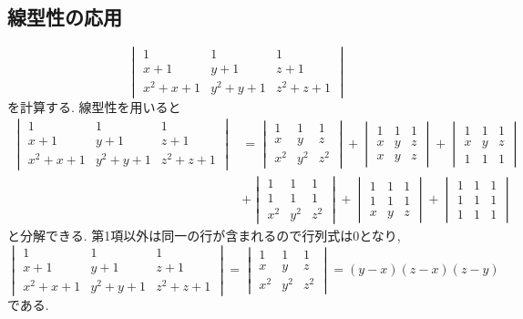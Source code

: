 \subsection{線型性の応用}
\begin{eg}
\[\begin{vmatrix}1&1&1\\x+1&y+1&z+1\\x^2+x+1&y^2+y+1&z^2+z+1\end{vmatrix}\]
を計算する.
線型性を用いると
\begin{align*}
\begin{vmatrix}1&1&1\\x+1&y+1&z+1\\x^2+x+1&y^2+y+1&z^2+z+1\end{vmatrix}
&=\begin{vmatrix}1&1&1\\x&y&z\\x^2&y^2&z^2\end{vmatrix}
+\begin{vmatrix}1&1&1\\x&y&z\\x&y&z\end{vmatrix}
+\begin{vmatrix}1&1&1\\x&y&z\\1&1&1\end{vmatrix}\\
&+\begin{vmatrix}1&1&1\\1&1&1\\x^2&y^2&z^2\end{vmatrix}
+\begin{vmatrix}1&1&1\\1&1&1\\x&y&z\end{vmatrix}
+\begin{vmatrix}1&1&1\\1&1&1\\1&1&1\end{vmatrix}
\end{align*}
と分解できる.
第1項以外は同一の行が含まれるので行列式は$0$となり,
\[\begin{vmatrix}1&1&1\\x+1&y+1&z+1\\x^2+x+1&y^2+y+1&z^2+z+1\end{vmatrix}=\begin{vmatrix}1&1&1\\x&y&z\\x^2&y^2&z^2\end{vmatrix}=(y-x)(z-x)(z-y)\]
である.
\end{eg}
